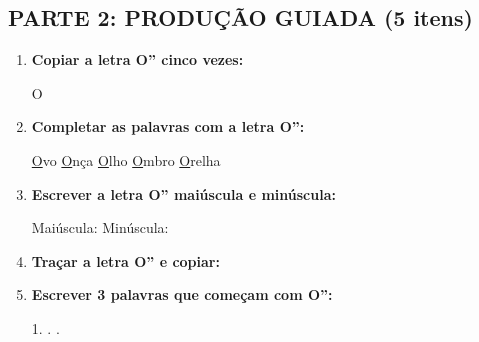 \begin{exercicio}
\subsection*{PARTE 2: PRODUÇÃO GUIADA (5 itens)}

\begin{enumerate}[resume]
  \item \textbf{Copiar a letra O'' cinco vezes:}
  \begin{center}
  O \quad \underline{\hspace{1.5cm}} \quad \underline{\hspace{1.5cm}} \quad \underline{\hspace{1.5cm}} \quad \underline{\hspace{1.5cm}} \quad \underline{\hspace{1.5cm}}
  \end{center}

  \item \textbf{Completar as palavras com a letra O'':}
  \begin{center}
  \underline{O}vo \quad \underline{O}nça \quad \underline{O}lho \quad \underline{O}mbro \quad \underline{O}relha
  \end{center}

  \item \textbf{Escrever a letra O'' maiúscula e minúscula:}
  \begin{center}
  Maiúscula: \underline{\hspace{2cm}} \quad Minúscula: \underline{\hspace{2cm}}
  \end{center}

  \item \textbf{Traçar a letra O'' e copiar:}
  \begin{center}
  \end{center}

  \item \textbf{Escrever 3 palavras que começam com O'':}
  \begin{center}
  1. \underline{\hspace{3cm}} . \underline{\hspace{3cm}} . \underline{\hspace{3cm}}
  \end{center}
\end{enumerate}


\end{exercicio}
